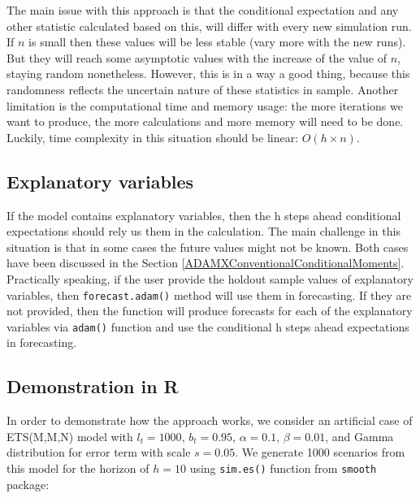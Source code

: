 \documentclass[
]{book}
\theoremstyle{definition}
\theoremstyle{definition}
\theoremstyle{definition}
\theoremstyle{definition}
\theoremstyle{remark}
\begin{document}
The main issue with this approach is that the conditional expectation and any other statistic calculated based on this, will differ with every new simulation run. If \(n\) is small then these values will be less stable (vary more with the new runs). But they will reach some asymptotic values with the increase of the value of \(n\), staying random nonetheless. However, this is in a way a good thing, because this randomness reflects the uncertain nature of these statistics in sample. Another limitation is the computational time and memory usage: the more iterations we want to produce, the more calculations and more memory will need to be done. Luckily, time complexity in this situation should be linear: \(O(h \times n)\).

\hypertarget{explanatory-variables}{%
\subsection{Explanatory variables}\label{explanatory-variables}}

If the model contains explanatory variables, then the h steps ahead conditional expectations should rely us them in the calculation. The main challenge in this situation is that in some cases the future values might not be known. Both cases have been discussed in the Section \ref{ADAMXConventionalConditionalMoments}. Practically speaking, if the user provide the holdout sample values of explanatory variables, then \texttt{forecast.adam()} method will use them in forecasting. If they are not provided, then the function will produce forecasts for each of the explanatory variables via \texttt{adam()} function and use the conditional h steps ahead expectations in forecasting.

\hypertarget{demonstration-in-r}{%
\subsection{Demonstration in R}\label{demonstration-in-r}}

In order to demonstrate how the approach works, we consider an artificial case of ETS(M,M,N) model with \(l_t=1000\), \(b_t=0.95\), \(\alpha=0.1\), \(\beta=0.01\), and Gamma distribution for error term with scale \(s=0.05\). We generate 1000 scenarios from this model for the horizon of \(h=10\) using \texttt{sim.es()} function from \texttt{smooth} package:
\end{document}
